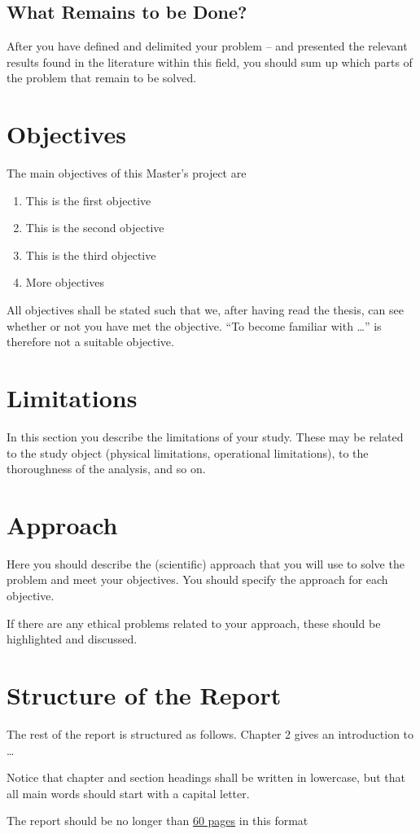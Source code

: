\subsection*{What Remains to be Done?}
After you have defined and delimited your problem -- and presented the relevant results found in the literature within this field, you should sum up which parts of the problem that remain to be solved.
\section{Objectives}
The main objectives of this Master's project are
\begin{enumerate}
\item This is the first objective
\item This is the second objective
\item This is the third objective
\item More objectives
\end{enumerate}

All objectives shall be stated such that we, after having read the thesis, can see whether or not you have met the objective. ``To become familiar with \ldots'' is therefore not a suitable objective.

\section{Limitations}
In this section you describe the limitations of your study. These may be related to the study object (physical limitations, operational limitations), to the thoroughness of the analysis, and so on.
\section{Approach}
Here you should describe the (scientific) approach that you will use to solve the problem and meet your objectives. You should specify the approach for each objective.

If there are any ethical problems related to your approach, these should be highlighted and discussed.
\section{Structure of the Report}
The rest of the report is structured as follows. Chapter 2 gives an introduction to \ldots

\begin{remark}
Notice that chapter and section headings shall be written in lowercase, but that all main words should start with a capital letter.
\end{remark}


The report should be no longer than \underline{60 pages} in this format 